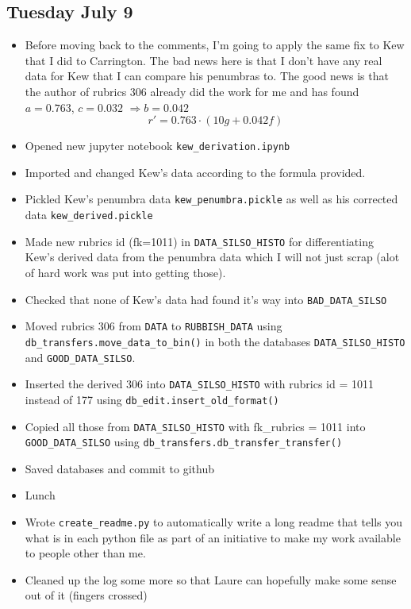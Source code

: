 \documentclass[12pt]{article}
\newcommand{\RA}{\Rightarrow}
\begin{document}
\subsection{Tuesday July 9}
\begin{itemize}
    \item Before moving back to the comments, I'm going to apply the same fix to Kew that I did to Carrington. The bad news here is that I don't have any real data for Kew that I can compare his penumbras to. The good news is that the author of rubrics 306 already did the work for me and has found $a = 0.763$, $c = 0.032$ $\RA b = 0.042$
    $$r' = 0.763 \cdot (10 g + 0.042 f)$$
    \item Opened new jupyter notebook \texttt{kew\_derivation.ipynb}
    \item Imported and changed Kew's data according to the formula provided.
    \item Pickled Kew's penumbra data \texttt{kew\_penumbra.pickle} as well as his corrected data \texttt{kew\_derived.pickle}
    \item Made new rubrics id (fk=1011) in \texttt{DATA\_SILSO\_HISTO} for differentiating Kew's derived data from the penumbra data which I will not just scrap (alot of hard work was put into getting those).
    \item Checked that none of Kew's data had found it's way into \texttt{BAD\_DATA\_SILSO}
    \item Moved rubrics 306 from \texttt{DATA} to \texttt{RUBBISH\_DATA} using \texttt{db\_transfers.move\_data\_to\_bin()} in both the databases \texttt{DATA\_SILSO\_HISTO} and \texttt{GOOD\_DATA\_SILSO}.
    \item Inserted the derived 306 into \texttt{DATA\_SILSO\_HISTO} with rubrics id = 1011 instead of 177 using \texttt{db\_edit.insert\_old\_format()}
    \item Copied all those from \texttt{DATA\_SILSO\_HISTO} with fk\_rubrics = 1011 into \texttt{GOOD\_DATA\_SILSO} using \texttt{db\_transfers.db\_transfer\_transfer()}
    \item Saved databases and commit to github
    \item Lunch
    \item Wrote \texttt{create\_readme.py} to automatically write a long readme that tells you what is in each python file as part of an initiative to make my work available to people other than me.
    \item Cleaned up the log some more so that Laure can hopefully make some sense out of it (fingers crossed)

\end{itemize}
\end{document}
